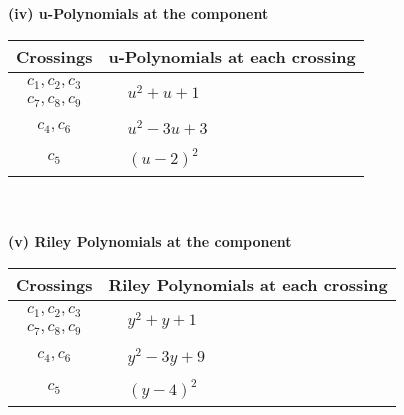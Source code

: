 \documentclass[1p]{elsarticle_modified}
\theoremstyle{definition}
\begin{document}
\newpage\renewcommand{\arraystretch}{1}
\flushleft \textbf{(iv) u-Polynomials at the component}\newline \\
\begin{tabular}{m{50pt}|m{274pt}}
Crossings & \hspace{64pt}u-Polynomials at each crossing \\
\hline $$\begin{aligned}c_{1},c_{2},c_{3}\\c_{7},c_{8},c_{9}\end{aligned}$$&$\begin{aligned}
&u^2+u+1
\end{aligned}$\\
\hline $$\begin{aligned}c_{4},c_{6}\end{aligned}$$&$\begin{aligned}
&u^2-3 u+3
\end{aligned}$\\
\hline $$\begin{aligned}c_{5}\end{aligned}$$&$\begin{aligned}
&(u-2)^2
\end{aligned}$\\
\hline
\end{tabular}\\~\\
\newpage\renewcommand{\arraystretch}{1}
\flushleft \textbf{(v) Riley Polynomials at the component}\newline \\
\begin{tabular}{m{50pt}|m{274pt}}
Crossings & \hspace{64pt}Riley Polynomials at each crossing \\
\hline $$\begin{aligned}c_{1},c_{2},c_{3}\\c_{7},c_{8},c_{9}\end{aligned}$$&$\begin{aligned}
&y^2+y+1
\end{aligned}$\\
\hline $$\begin{aligned}c_{4},c_{6}\end{aligned}$$&$\begin{aligned}
&y^2-3 y+9
\end{aligned}$\\
\hline $$\begin{aligned}c_{5}\end{aligned}$$&$\begin{aligned}
&(y-4)^2
\end{aligned}$\\
\hline
\end{tabular}\\~\\
\end{document}
